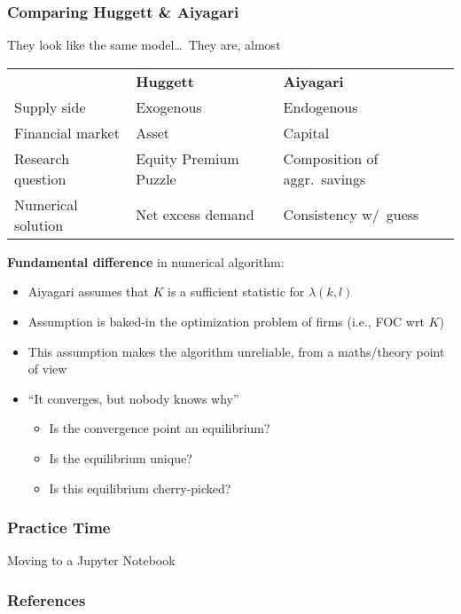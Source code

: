 \documentclass[10pt, aspectratio=1610, natbib, handout]{beamer}
\begin{document}
  \begin{frame}
    \frametitle{Comparing Huggett \& Aiyagari}

    They look like the same model\dots\ They are, almost

    \vfill\pause

    \begin{table}
      \centering
      \begin{tabular}{lll}
        \toprule
        & \textbf{Huggett} & \textbf{Aiyagari} \\
        \cmidrule{2-3}
        Supply side & Exogenous & Endogenous \\
        Financial market & Asset & Capital \\
        Research question & Equity Premium Puzzle & Composition of aggr.~savings \\
        Numerical solution & Net excess demand & Consistency w/~guess \\
        \bottomrule
      \end{tabular}
    \end{table}

    \vfill\pause

    \textbf{Fundamental difference} in numerical algorithm:
    \begin{itemize}
      \item Aiyagari assumes that $K$ is a sufficient statistic for $\lambda(k, l)$
      \item Assumption is baked-in the optimization problem of firms (i.e., FOC wrt $K$)
      \item This assumption makes the algorithm unreliable, from a maths/theory point of view
      \item ``It converges, but nobody knows why''
        \begin{itemize}
          \item Is the convergence point an equilibrium?
          \item Is the equilibrium unique?
          \item Is this equilibrium cherry-picked?
        \end{itemize}
    \end{itemize}

  \end{frame}

  \begin{frame}
    \frametitle{Practice Time}

    Moving to a Jupyter Notebook

  \end{frame}

  \appendix


  \begin{frame}
    \frametitle{References}

    
    

  \end{frame}
\end{document}
